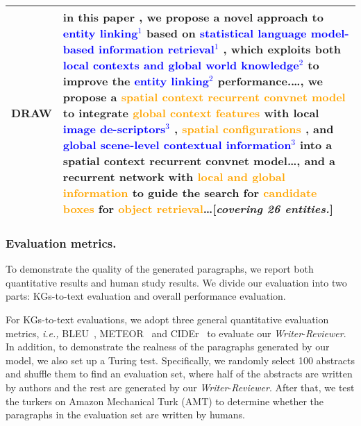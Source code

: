 \documentclass[letterpaper]{article}
\def\xgh{\textcolor{black}}
\def\hmg{\textcolor{black}}
\def\ie{\emph{i.e., }}
\begin{document}
\begin{table*}[t]
\begin{center}
\begin{tabular}{l p{15cm}}
		
  \\ 
		DRAW &  in this paper , we propose a novel approach to  \textcolor{blue}{entity linking$ ^{1}$} based on \textcolor{blue}{statistical language model-based information retrieval$ ^{1}$} , which exploits both \textcolor{blue}{local contexts and global world knowledge$ ^{2}$} to improve the \textcolor{blue}{entity linking$ ^{2}$} performance.\dots, we propose a \textcolor{orange}{spatial context recurrent convnet model} to integrate \textcolor{orange}{global context features} with local \textcolor{blue}{image de-scriptors$ ^{3}$} ,\textcolor{orange}{ spatial configurations} , and \textcolor{blue}{global scene-level contextual information$ ^{3}$} into a spatial context recurrent convnet model\dots, and a recurrent network with \textcolor{orange}{local and global information} to guide the search for \textcolor{orange}{candidate boxes} for \textcolor{orange}{object retrieval}\dots [\textit{covering 26 entities.}]
  \\ \bottomrule
	\end{tabular}
	\caption{ Example outputs of various models. \xgh{To better visualize the generated text, we omit information irrelevant to the comparisons.} Repetitive words are represented in \textcolor{red}{red} and entities included in KGs are represented in \textcolor{orange}{orange}. The potential knowledge is represented in \textcolor{blue}{blue} with the corresponding superscript.
	}
	\label{tab:example}
	\end{center}
\end{table*}

\subsubsection{Evaluation metrics.} 
To demonstrate the quality of the generated paragraphs, we report both quantitative results and human study results.
We divide our evaluation into two parts: KGs-to-text evaluation and overall performance evaluation.

For KGs-to-text evaluations, we adopt three general quantitative evaluation metrics, \ie BLEU~\cite{10.3115/1073083.1073135}, METEOR~\cite{Denkowski2014MeteorUL} and CIDEr~\cite{Vedantam2015CIDErCI} to 
evaluate our \textit{Writer}-\textit{Reviewer}. In addition, to demonstrate the realness of the paragraphs generated by our model,
we also set up a Turing test. Specifically, we randomly select 100 abstracts and shuffle them to \hmg{find} an evaluation set, where half of the abstracts are written by authors and the rest are generated by our \textit{Writer}-\textit{Reviewer}. 
After that, we test the turkers on Amazon Mechanical Turk (AMT) to determine whether the paragraphs in the evaluation set are written by humans.
\end{document}
